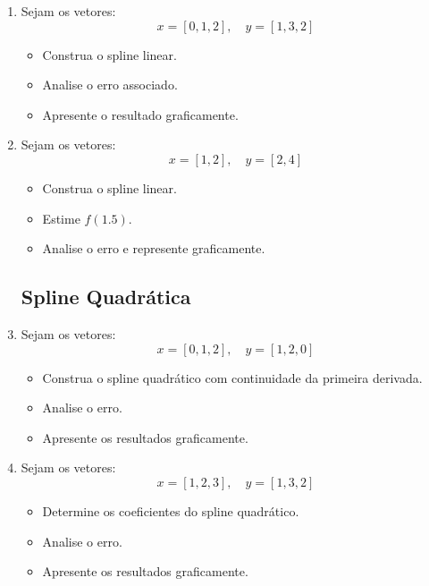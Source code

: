 \begin{enumerate}[label=\thesection.\arabic*]
\subsection*{Spline Linear}

\item Sejam os vetores:
\[
x = [0, 1, 2], \quad y = [1, 3, 2]
\]

\begin{itemize}
    \item Construa o spline linear.
    \item Analise o erro associado.
    \item Apresente o resultado graficamente.
\end{itemize}

\item Sejam os vetores:
\[
x = [1, 2], \quad y = [2, 4]
\]

\begin{itemize}
    \item Construa o spline linear.
    \item Estime $f(1.5)$.
    \item Analise o erro e represente graficamente.
\end{itemize}

\subsection*{Spline Quadrática}

\item Sejam os vetores:
\[
x = [0, 1, 2], \quad y = [1, 2, 0]
\]

\begin{itemize}
    \item Construa o spline quadrático com continuidade da primeira derivada.
    \item Analise o erro.
    \item Apresente os resultados graficamente.
\end{itemize}

\item Sejam os vetores:
\[
x = [1, 2, 3], \quad y = [1, 3, 2]
\]

\begin{itemize}
    \item Determine os coeficientes do spline quadrático.
    \item Analise o erro.
    \item Apresente os resultados graficamente.
\end{itemize}


\end{enumerate}
